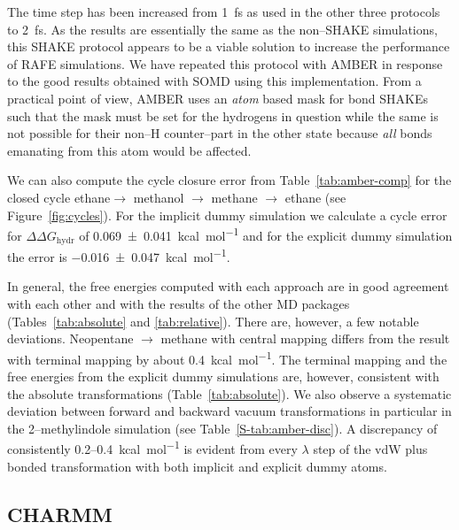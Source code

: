 \documentclass[journal=jctcce,manuscript=article]{achemso}
\begin{document}
The time step has been increased from \SI{1}{fs} as used in the other 
three protocols to \SI{2}{fs}.  As the results are essentially the same as the 
non--SHAKE simulations, this SHAKE protocol appears to be a viable solution to 
increase the performance of RAFE simulations.  We have repeated this protocol 
with AMBER in response to the good results obtained with SOMD using this implementation.  
From a practical point of view, AMBER uses an \emph{atom} based mask for bond SHAKEs such that the mask must be 
set for the hydrogens in question while the same is not possible for their 
non--H counter--part in the other state because \emph{all} bonds emanating from 
this atom would be affected.

We can also compute the cycle closure error from Table~\ref{tab:amber-comp} for 
the closed cycle ethane$ \rightarrow$ methanol $\rightarrow$ methane 
$\rightarrow$ ethane (see Figure~\ref{fig:cycles}). For the implicit dummy simulation we calculate a cycle error for $\Delta\Delta G_\mathrm{hydr}$ of \SI{0.069+-0.041}{kcal.mol^{-1}} and for the explicit dummy 
simulation the error is \SI{-0.016+-0.047}{kcal.mol^{-1}}.

In general, the free energies computed with each approach are in good agreement 
with each other and with the results of the other MD packages (Tables~\ref{tab:absolute} and \ref{tab:relative}).  There are, however, a few notable deviations.  Neopentane $\rightarrow$ methane with central mapping differs from the result with terminal mapping by about \SI{0.4}{kcal.mol^{-1}}.  The terminal mapping and the free energies from the explicit dummy simulations are, however, consistent with the absolute transformations (Table~\ref{tab:absolute}).  We also observe a systematic deviation between forward and backward vacuum transformations in particular in the 2--methylindole simulation (see Table~\ref{S-tab:amber-disc}).  A discrepancy of consistently 0.2--\SI{0.4}{kcal.mol^{-1}} is evident from every $\lambda$ step of the vdW plus bonded transformation with both implicit and explicit dummy atoms.

\subsection{CHARMM}
\label{sec:charmm-results}

\end{document}
